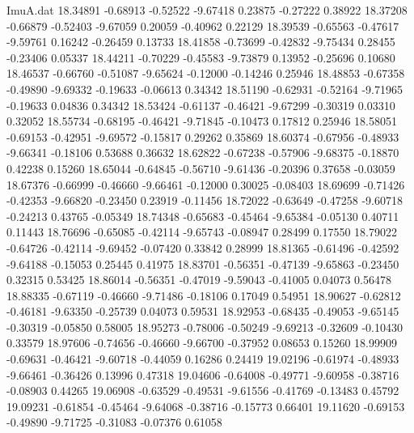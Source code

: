 \begin{filecontents}{ImuA.dat}
  18.34891   -0.68913   -0.52522   -9.67418    0.23875   -0.27222    0.38922
  18.37208   -0.66879   -0.52403   -9.67059    0.20059   -0.40962    0.22129
  18.39539   -0.65563   -0.47617   -9.59761    0.16242   -0.26459    0.13733
  18.41858   -0.73699   -0.42832   -9.75434    0.28455   -0.23406    0.05337
  18.44211   -0.70229   -0.45583   -9.73879    0.13952   -0.25696    0.10680
  18.46537   -0.66760   -0.51087   -9.65624   -0.12000   -0.14246    0.25946
  18.48853   -0.67358   -0.49890   -9.69332   -0.19633   -0.06613    0.34342
  18.51190   -0.62931   -0.52164   -9.71965   -0.19633    0.04836    0.34342
  18.53424   -0.61137   -0.46421   -9.67299   -0.30319    0.03310    0.32052
  18.55734   -0.68195   -0.46421   -9.71845   -0.10473    0.17812    0.25946
  18.58051   -0.69153   -0.42951   -9.69572   -0.15817    0.29262    0.35869
  18.60374   -0.67956   -0.48933   -9.66341   -0.18106    0.53688    0.36632
  18.62822   -0.67238   -0.57906   -9.68375   -0.18870    0.42238    0.15260
  18.65044   -0.64845   -0.56710   -9.61436   -0.20396    0.37658   -0.03059
  18.67376   -0.66999   -0.46660   -9.66461   -0.12000    0.30025   -0.08403
  18.69699   -0.71426   -0.42353   -9.66820   -0.23450    0.23919   -0.11456
  18.72022   -0.63649   -0.47258   -9.60718   -0.24213    0.43765   -0.05349
  18.74348   -0.65683   -0.45464   -9.65384   -0.05130    0.40711    0.11443
  18.76696   -0.65085   -0.42114   -9.65743   -0.08947    0.28499    0.17550
  18.79022   -0.64726   -0.42114   -9.69452   -0.07420    0.33842    0.28999
  18.81365   -0.61496   -0.42592   -9.64188   -0.15053    0.25445    0.41975
  18.83701   -0.56351   -0.47139   -9.65863   -0.23450    0.32315    0.53425
  18.86014   -0.56351   -0.47019   -9.59043   -0.41005    0.04073    0.56478
  18.88335   -0.67119   -0.46660   -9.71486   -0.18106    0.17049    0.54951
  18.90627   -0.62812   -0.46181   -9.63350   -0.25739    0.04073    0.59531
  18.92953   -0.68435   -0.49053   -9.65145   -0.30319   -0.05850    0.58005
  18.95273   -0.78006   -0.50249   -9.69213   -0.32609   -0.10430    0.33579
  18.97606   -0.74656   -0.46660   -9.66700   -0.37952    0.08653    0.15260
  18.99909   -0.69631   -0.46421   -9.60718   -0.44059    0.16286    0.24419
  19.02196   -0.61974   -0.48933   -9.66461   -0.36426    0.13996    0.47318
  19.04606   -0.64008   -0.49771   -9.60958   -0.38716   -0.08903    0.44265
  19.06908   -0.63529   -0.49531   -9.61556   -0.41769   -0.13483    0.45792
  19.09231   -0.61854   -0.45464   -9.64068   -0.38716   -0.15773    0.66401
  19.11620   -0.69153   -0.49890   -9.71725   -0.31083   -0.07376    0.61058

\end{filecontents}
